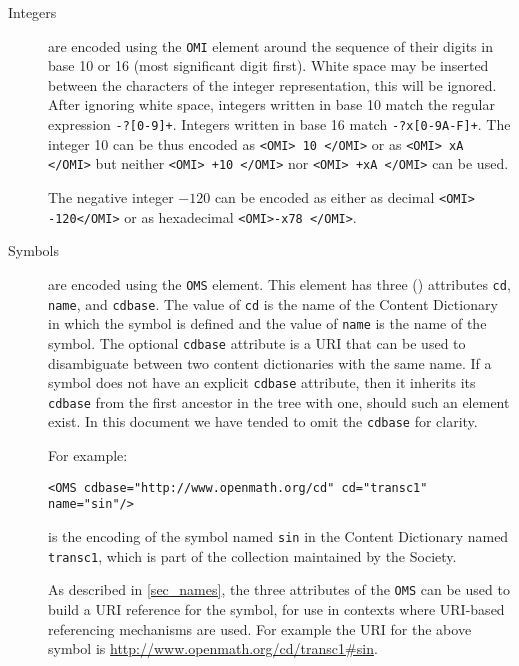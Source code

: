 \begin{description}
\item[Integers] are encoded using the
  \lstinline|OMI| element around the sequence of their
  digits in base 10 or 16 (most significant digit first).  White space
  may be inserted between the characters of the integer representation,
  this will be ignored.  After ignoring white space, integers written in
  base 10 match the regular expression
  \lstinline|-?[0-9]+|.  Integers written in base 16 match
  \lstinline|-?x[0-9A-F]+|.  The integer 10 can be thus
  encoded as \lstinline|<OMI> 10 </OMI>| or as
  \lstinline|<OMI> xA </OMI>| but neither
  \lstinline|<OMI> +10 </OMI>| nor
  \lstinline|<OMI> +xA </OMI>| can be used.

  The negative integer $-120$ can be encoded
  as either as decimal \lstinline|<OMI> -120</OMI>| or as hexadecimal 
  \lstinline|<OMI>-x78 </OMI>|.
\item[Symbols] are encoded using the \lstinline|OMS| element. This element has three
  (\XML) attributes \lstinline|cd|, \lstinline|name|, and \lstinline|cdbase|. The value
  of \lstinline|cd| is the name of the Content Dictionary in which the symbol is defined
  and the value of \lstinline|name| is the name of the symbol.  The optional
  \lstinline|cdbase| attribute is a URI that can be used to disambiguate between two
  content dictionaries with the same name.  If a symbol does not have an explicit
  \lstinline|cdbase| attribute, then it inherits its \lstinline|cdbase| from the first
  ancestor in the \XML tree with one, should such an element exist.  In this document we
  have tended to omit the \lstinline|cdbase| for clarity.
  
  For example:
\begin{lstlisting}
<OMS cdbase="http://www.openmath.org/cd" cd="transc1" name="sin"/>
\end{lstlisting}
  is the encoding of the symbol named \lstinline|sin| in the Content Dictionary named
  \lstinline|transc1|, which is part of the collection maintained by the \OM Society.


  As described in \ref{sec_names}, the three attributes of the \lstinline|OMS| can be used
  to build a URI reference for the symbol, for use in contexts where URI-based referencing
  mechanisms are used.  For example the URI for the above symbol is
  \url{http://www.openmath.org/cd/transc1\#sin}.


\end{description}
